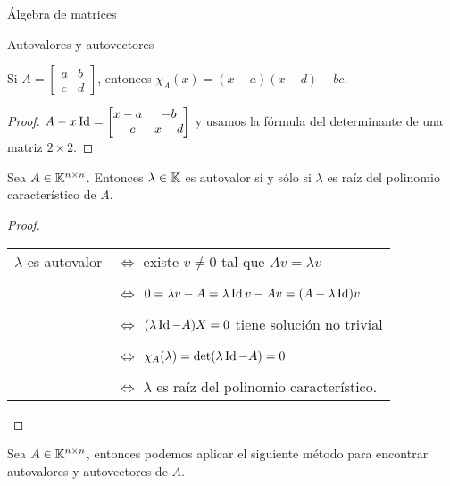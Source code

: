 \begin{chapter}{\'Algebra de matrices}
\begin{section}{Autovalores y autovectores}
        \begin{ejemplo*} Si $A=\begin{bmatrix}a&b\\c&d \end{bmatrix}$, entonces $\chi_{A}(x)=(x-a)(x-d) - bc $.
        \end{ejemplo*}
        \begin{proof}  $A-x \operatorname{Id}=\begin{bmatrix} x-a&-b\\-c&x-d \end{bmatrix}$ y usamos la fórmula del determinante de una matriz $2\times 2$. 
        \end{proof}

        \begin{proposicion}
                Sea $A\in \mathbb K^{n \times n}$.  Entonces $\lambda\in \mathbb K$ es autovalor si y sólo si $\lambda$ es raíz del polinomio característico de $A$. 
            \end{proposicion}
            \begin{proof}
                ~
                \begin{center}
                    \begin{tabular}{rl}
                        $\lambda$ es autovalor &$\Leftrightarrow$ existe $v \ne 0$ tal que $Av = \lambda v$ \\
                                    &\\
                                    &$\Leftrightarrow$ $0 = \lambda v -A  =   \lambda \operatorname{Id} v -Av =  (A-\lambda \operatorname{Id})v$ \\
                                    &\\
                                    &$\Leftrightarrow$ $(\lambda \operatorname{Id}-A)X=0$ tiene solución no trivial \\
                                    &\\
                                    &$\Leftrightarrow$ $\chi_A(\lambda) = \det(\lambda \operatorname{Id}-A) =0$ \\
                                    &\\
                                    &$\Leftrightarrow$ $\lambda$ es raíz del polinomio característico.  
                                \end{tabular}
                \end{center}
            \end{proof}

        \begin{observacion*} Sea $A\in \mathbb K^{n \times n}$, entonces podemos aplicar el siguiente método para encontrar autovalores y autovectores de $A$.
\end{observacion*}
\end{section}
\end{chapter}

